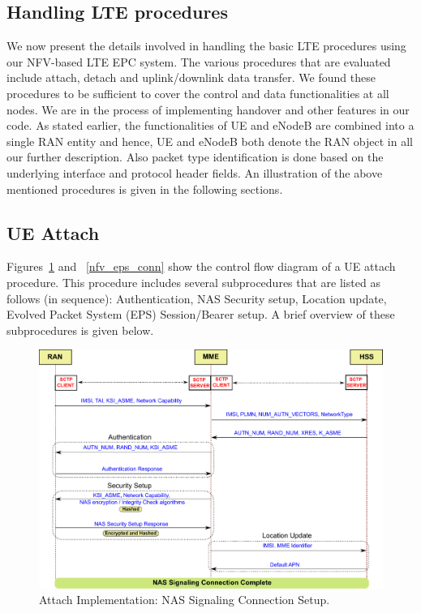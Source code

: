 \documentclass[hidelinks]{report}
\begin{document}
\subsection*{Handling LTE procedures}

We now present the details involved in handling the basic LTE procedures using our NFV-based LTE EPC system. The various procedures that are evaluated include attach, detach and uplink/downlink data transfer. We found these procedures to be sufficient to cover the control and data functionalities at all nodes. We are in the process of implementing handover and other features in our code. As stated earlier, the functionalities of UE and eNodeB are combined into a single RAN entity and hence, UE and eNodeB both denote the RAN object in all our further description. Also packet type identification is done based on the underlying interface and protocol header fields. An illustration of the above mentioned procedures is given in the following sections.

\subsection*{UE Attach}
Figures~\ref{nfv_nas_conn} and ~\ref{nfv_eps_conn} show the control flow diagram of a UE attach procedure. This procedure includes several subprocedures that are listed as follows (in sequence): Authentication, NAS Security setup, Location update, Evolved Packet System (EPS) Session/Bearer setup. A brief overview of these subprocedures is given below.

\begin{figure}[h]

\centering
\includegraphics[scale=0.5]{nfv_nas_conn}
\caption{Attach Implementation: NAS Signaling Connection Setup.}
\label{nfv_nas_conn}

\end{figure}
\end{document}
